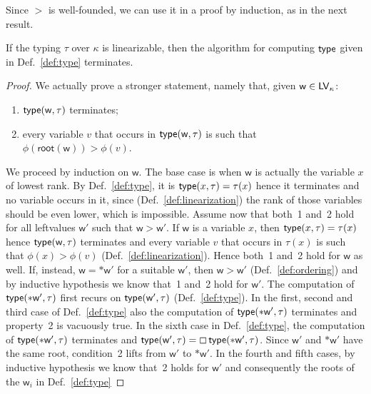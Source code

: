 Since $>$ is well-founded, we can use it in a proof by induction, as in the next result.

\begin{proposition}\label{prop:termination}
  If the typing $\tau$ over $\kappa$ is linearizable, then the algorithm for computing $\mathsf{type}$ given in
  Def.~\ref{def:type} terminates.
\end{proposition}
\begin{proof}
  We actually prove a stronger statement, namely that, given $\mathsf{w}\in\mathsf{LV}_\kappa$:
  \begin{enumerate}
  \item $\mathsf{type}(\mathsf{w},\tau)$ terminates;
  \item every variable $v$ that occurs in $\mathsf{type}(\mathsf{w},\tau)$
    is such that $\phi(\mathsf{root}(\mathsf{w}))>\phi(v)$.
  \end{enumerate}
  We proceed by induction on $\mathsf{w}$. The base case is when $\mathsf{w}$ is actually the variable $x$
  of lowest rank. By Def.~\ref{def:type}, it is $\mathsf{type}(x,\tau)=\tau(x)$ hence it terminates and
  no variable occurs in it, since (Def.~\ref{def:linearization})
  the rank of those variables should be even lower, which is impossible.
  Assume now that both~1 and~2 hold for all leftvalues $\mathsf{w}'$ such that $\mathsf{w}>\mathsf{w}'$.
  If $\mathsf{w}$ is a variable $x$, then $\mathsf{type}(x,\tau)=\tau(x)$ hence
  $\mathsf{type}(\mathsf{w},\tau)$ terminates and every variable $v$ that occurs in $\tau(x)$ is such that
  $\phi(x)>\phi(v)$ (Def.~\ref{def:linearization}). Hence both~1 and~2 hold for $\mathsf{w}$ as well.
  If, instead, $\mathsf{w}=\mathtt{*}\mathsf{w}'$ for a suitable $\mathsf{w}'$,
  then $\mathsf{w}>\mathsf{w}'$ (Def.~\ref{def:ordering}) and by inductive hypothesis we know that~1
  and~2 hold for $\mathsf{w}'$. The computation of $\mathsf{type}(\mathtt{*}\mathsf{w}',\tau)$
  first recurs on $\mathsf{type}(\mathsf{w}',\tau)$ (Def.~\ref{def:type}).
  In the first, second and third case of Def.~\ref{def:type} also the
  computation of $\mathsf{type}(\mathtt{*}\mathsf{w}',\tau)$ terminates and property~2 is vacuously true.
  In the sixth case in Def.~\ref{def:type}, the computation of
  $\mathsf{type}(\mathtt{*}\mathsf{w}',\tau)$ terminates and
  $\mathsf{type}(\mathsf{w}',\tau)=\boxempty\,{\mathsf{type}(\mathtt{*}\mathsf{w}',\tau)}$.
  Since $\mathsf{w}'$ and $\mathtt{*}\mathsf{w}'$ have the same root, condition~2
  lifts from $\mathsf{w}'$ to $\mathtt{*}\mathsf{w}'$.
  In the fourth and fifth cases, by inductive hypothesis we know that~2 holds
  for $\mathsf{w}'$ and consequently the roots of the $\mathsf{w}_i$ in Def.~\ref{def:type}

\end{proof}
